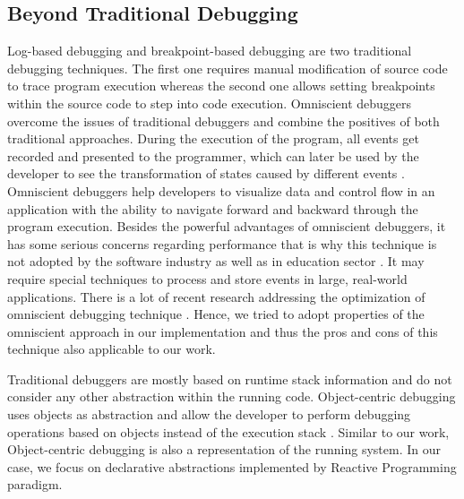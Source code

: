 \subsection{Beyond Traditional Debugging}
Log-based debugging and breakpoint-based debugging are two traditional debugging techniques. The first one requires manual modification of source code to trace program execution whereas the second one allows setting breakpoints within the source code to step into code execution. Omniscient debuggers overcome the issues of traditional debuggers and combine the positives of both traditional approaches. During the execution of the program, all events get recorded and presented to the programmer, which can later be used by the developer to see the transformation of states caused by different events \cite{Pothier:2007:SOD:1297105.1297067}. Omniscient debuggers help developers to visualize data and control flow in an application with the ability to navigate forward and backward through the program execution. Besides the powerful advantages of omniscient debuggers, it has some serious concerns regarding performance that is why this technique is not adopted by the software industry as well as in education sector \cite{6983851}. It may require special techniques to process and store events in large, real-world applications. There is a lot of recent research addressing the optimization of omniscient debugging technique  \cite{Pothier:2007:SOD:1297105.1297067,Pothier2011,Lienhard2008}.
Hence, we tried to adopt properties of the omniscient approach in our implementation and thus the pros and cons of this technique also applicable to our work.

Traditional debuggers are mostly based on runtime stack information and do not consider any other abstraction within the running code. Object-centric debugging uses objects as abstraction and allow the developer to perform debugging operations based on objects instead of the execution stack \cite{Ressia:2012:OD:2337223.2337280}. Similar to our work, Object-centric debugging is also a representation of the running system. In our case, we focus on declarative abstractions implemented by Reactive Programming paradigm.

